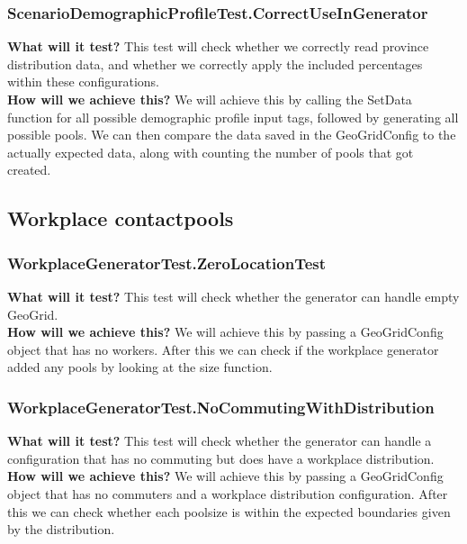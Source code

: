 \documentclass{article}
\begin{document}
\subsubsection{ScenarioDemographicProfileTest.CorrectUseInGenerator}
\textbf{What will it test?} 
This test will check whether we correctly read province distribution data, and whether we correctly apply the included percentages within these configurations. \\
\newline
\textbf{How will we achieve this?}
We will achieve this by calling the SetData function for all possible demographic profile input tags, followed by generating all possible pools. We can then compare the data saved in the GeoGridConfig to the actually expected data, along with counting the number of pools that got created.

\subsection{Workplace contactpools}

\subsubsection{WorkplaceGeneratorTest.ZeroLocationTest}
\textbf{What will it test?}
This test will check whether the generator can handle empty GeoGrid.\\
\newline
\textbf{How will we achieve this?}
We will achieve this by passing a GeoGridConfig object that has no workers. After this we can check if the workplace generator added any pools by looking at the size function.

\subsubsection{WorkplaceGeneratorTest.NoCommutingWithDistribution}
\textbf{What will it test?}
This test will check whether the generator can handle a configuration that has no commuting but does have a workplace distribution.\\
\newline
\textbf{How will we achieve this?}
We will achieve this by passing a GeoGridConfig object that has no commuters and a workplace distribution configuration. After this we can check whether each poolsize is within the expected boundaries given by the distribution.
\end{document}
